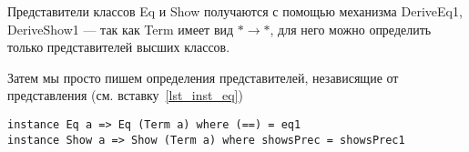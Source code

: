 Представители классов Eq и Show получаются с помощью механизма DeriveEq1, DeriveShow1\cite{deriveCompat} --- так как Term имеет вид $* \rightarrow *$, для него можно определить только представителей высших классов\cite{prel_extras}.

Затем мы просто пишем определения представителей, независящие от представления (см. вставку~\ref{lst_inst_eq})

\begin{lstlisting}[caption={Определение представителей классов Eq и Show для представления АСД}, captionpos=b, frame=single, float,floatplacement=H, label = {lst_inst_eq}]
instance Eq a => Eq (Term a) where (==) = eq1
instance Show a => Show (Term a) where showsPrec = showsPrec1
\end{lstlisting}

